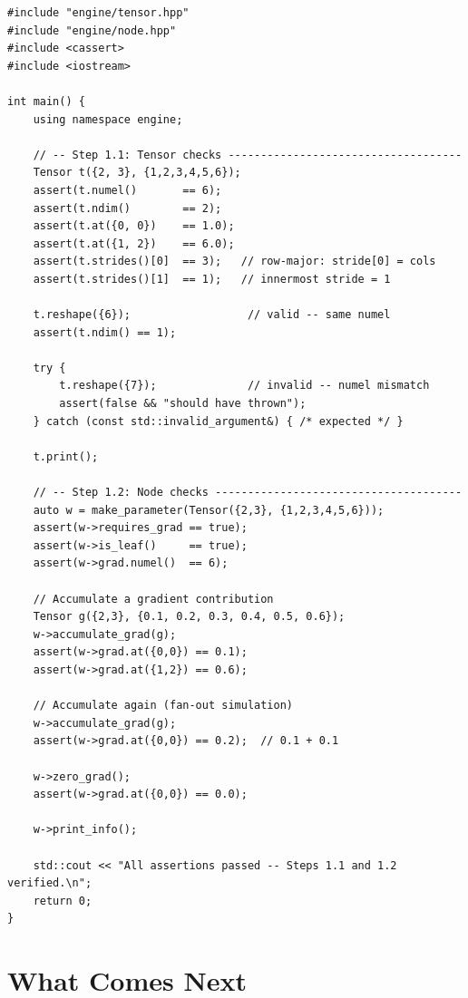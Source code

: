 \documentclass[12pt, a4paper]{article}
\begin{document}
\begin{lstlisting}[caption={smoke\_test.cpp - verifies Steps 1.1 and 1.2}]
#include "engine/tensor.hpp"
#include "engine/node.hpp"
#include <cassert>
#include <iostream>

int main() {
    using namespace engine;

    // -- Step 1.1: Tensor checks ------------------------------------
    Tensor t({2, 3}, {1,2,3,4,5,6});
    assert(t.numel()       == 6);
    assert(t.ndim()        == 2);
    assert(t.at({0, 0})    == 1.0);
    assert(t.at({1, 2})    == 6.0);
    assert(t.strides()[0]  == 3);   // row-major: stride[0] = cols
    assert(t.strides()[1]  == 1);   // innermost stride = 1

    t.reshape({6});                  // valid -- same numel
    assert(t.ndim() == 1);

    try {
        t.reshape({7});              // invalid -- numel mismatch
        assert(false && "should have thrown");
    } catch (const std::invalid_argument&) { /* expected */ }

    t.print();

    // -- Step 1.2: Node checks --------------------------------------
    auto w = make_parameter(Tensor({2,3}, {1,2,3,4,5,6}));
    assert(w->requires_grad == true);
    assert(w->is_leaf()     == true);
    assert(w->grad.numel()  == 6);

    // Accumulate a gradient contribution
    Tensor g({2,3}, {0.1, 0.2, 0.3, 0.4, 0.5, 0.6});
    w->accumulate_grad(g);
    assert(w->grad.at({0,0}) == 0.1);
    assert(w->grad.at({1,2}) == 0.6);

    // Accumulate again (fan-out simulation)
    w->accumulate_grad(g);
    assert(w->grad.at({0,0}) == 0.2);  // 0.1 + 0.1

    w->zero_grad();
    assert(w->grad.at({0,0}) == 0.0);

    w->print_info();

    std::cout << "All assertions passed -- Steps 1.1 and 1.2 verified.\n";
    return 0;
}
\end{lstlisting}

\section{What Comes Next}
\end{document}
